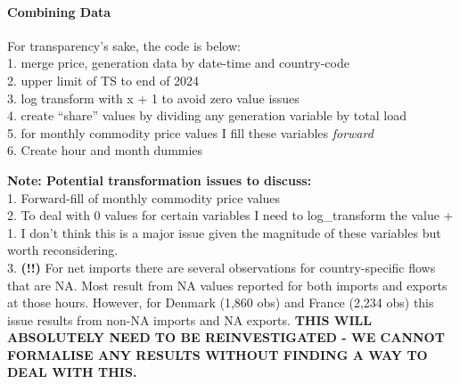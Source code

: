 \documentclass[
]{article}
\begin{document}
\paragraph{\texorpdfstring{\textbf{Combining
Data}}{Combining Data}}\label{combining-data}

For transparency's sake, the code is below:\\
1. merge price, generation data by date-time and country-code\\
2. upper limit of TS to end of 2024\\
3. log transform with x + 1 to avoid zero value issues\\
4. create ``share'' values by dividing any generation variable by total
load\\
5. for monthly commodity price values I fill these variables
\emph{forward}\\
6. Create hour and month dummies

\textbf{Note: Potential transformation issues to discuss:}\\
1. Forward-fill of monthly commodity price values\\
2. To deal with 0 values for certain variables I need to log\_transform
the value + 1. I don't think this is a major issue given the magnitude
of these variables but worth reconsidering.\\
3. \textbf{(!!)} For net imports there are several observations for
country-specific flows that are NA. Most result from NA values reported
for both imports and exports at those hours. However, for Denmark (1,860
obs) and France (2,234 obs) this issue results from non-NA imports and
NA exports. \textbf{THIS WILL ABSOLUTELY NEED TO BE REINVESTIGATED - WE
CANNOT FORMALISE ANY RESULTS WITHOUT FINDING A WAY TO DEAL WITH THIS.}
\end{document}

